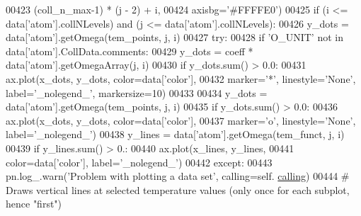 \begin{DoxyCode}
00423                                          (coll\_n\_max-1) * (j - 2) + i,
00424                                          axisbg=\textcolor{stringliteral}{'#FFFFE0'})
00425                         \textcolor{keywordflow}{if} (i <= data[\textcolor{stringliteral}{'atom'}].collNLevels) \textcolor{keywordflow}{and} (j <= data[\textcolor{stringliteral}{'atom'}].collNLevels):
00426                             y\_dots = data[\textcolor{stringliteral}{'atom'}].getOmega(tem\_points, j, i)
00427                             \textcolor{keywordflow}{try}:
00428                                 \textcolor{keywordflow}{if} \textcolor{stringliteral}{'O\_UNIT'} \textcolor{keywordflow}{not} \textcolor{keywordflow}{in} data[\textcolor{stringliteral}{'atom'}].CollData.comments:
00429                                     y\_dots = coeff * data[\textcolor{stringliteral}{'atom'}].getOmegaArray(j, i)
00430                                     \textcolor{keywordflow}{if} y\_dots.sum() > 0.0:
00431                                         ax.plot(x\_dots, y\_dots, color=data[\textcolor{stringliteral}{'color'}],
00432                                                 marker=\textcolor{stringliteral}{'*'}, linestyle=\textcolor{stringliteral}{'None'}, label=\textcolor{stringliteral}{'\_nolegend\_'}, 
      markersize=10)
00433                                     
00434                                 y\_dots = data[\textcolor{stringliteral}{'atom'}].getOmega(tem\_points, j, i)
00435                                 \textcolor{keywordflow}{if} y\_dots.sum() > 0.0:
00436                                     ax.plot(x\_dots, y\_dots, color=data[\textcolor{stringliteral}{'color'}],
00437                                             marker=\textcolor{stringliteral}{'o'}, linestyle=\textcolor{stringliteral}{'None'}, label=\textcolor{stringliteral}{'\_nolegend\_'})
00438                                 y\_lines = data[\textcolor{stringliteral}{'atom'}].getOmega(tem\_funct, j, i)
00439                                 \textcolor{keywordflow}{if} y\_lines.sum() > 0.:
00440                                     ax.plot(x\_lines, y\_lines,
00441                                             color=data[\textcolor{stringliteral}{'color'}], label=\textcolor{stringliteral}{'\_nolegend\_'})
00442                             \textcolor{keywordflow}{except}:
00443                                 pn.log\_.warn(\textcolor{stringliteral}{'Problem with plotting a data set'}, calling=self.
      \hyperlink{classpyneb_1_1plot_1_1plot_atomic_data_1_1_data_plot_a393a133b607541c57d5ebc5a34687e3f}{calling})
00444 \textcolor{comment}{# Draws vertical lines at selected temperature values (only once for each subplot, hence "first") }

\end{DoxyCode}
